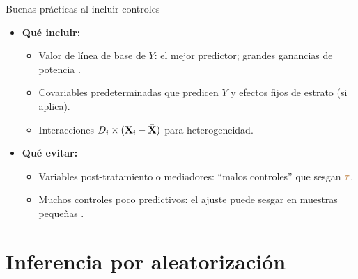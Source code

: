 \documentclass[10pt, xcolor=dvipsnames]{beamer}
\begin{document}
\begin{frame}{Buenas prácticas al incluir controles}
\fontvie
\begin{itemize}
    \item \textbf{Qué incluir:}
    \begin{itemize}
        \item Valor de línea de base de \(Y\): el mejor predictor; grandes ganancias de potencia \citep{mckenzie2012}.
        \item Covariables predeterminadas que predicen \(Y\) y efectos fijos de estrato (si aplica).
        \item Interacciones \(D_i \times (\textbf{X}_i - \bar{\textbf{X}})\) para heterogeneidad.
    \end{itemize}
    \item \textbf{Qué evitar:}
    \begin{itemize}
        \item Variables post-tratamiento o mediadores: ``malos controles'' que sesgan \(\textcolor{brown}{\tau}\).
        \item Muchos controles poco predictivos: el ajuste puede sesgar en muestras pequeñas \citep{Freedman2008}.
    \end{itemize}
\end{itemize}
\end{frame}


\section{Inferencia por aleatorización}
\end{document}
